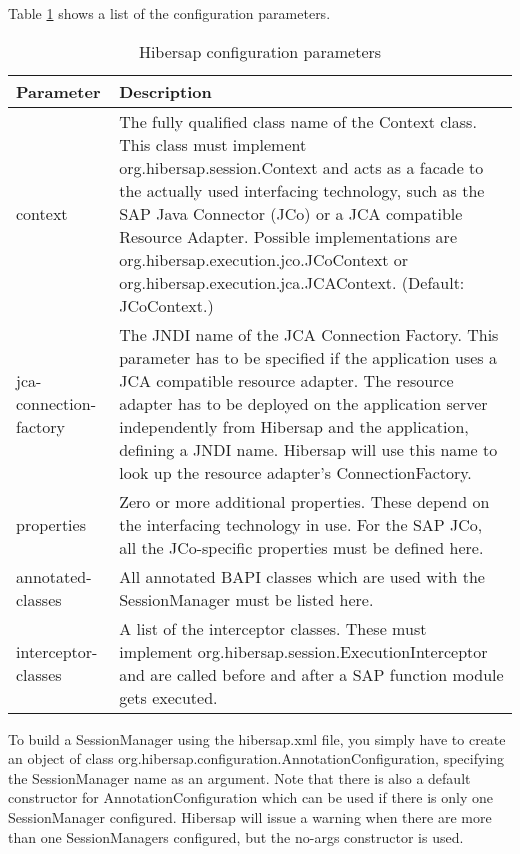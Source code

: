 Table \ref{tab:ConfigurationParameters} shows a list of the configuration parameters.

\begin{table}[H]
  \centering
  \begin{tabular}{ll} 
    \toprule
    \textbf{Parameter}      & \textbf{Description} \\ 
    \midrule
    context                      & \parbox[t]{4.7in}{
    The fully qualified class name of the Context class. This class must implement org.hibersap.session.Context and acts as a   facade to the actually used interfacing technology, such as the SAP Java Connector (JCo) or a JCA compatible Resource Adapter. Possible implementations are org.hibersap.execution.jco.JCoContext or org.hibersap.execution.jca.JCAContext. (Default: JCoContext.)
    }   \\
    jca-connection-factory  & \parbox[t]{4.7in}{
    The JNDI name of the JCA Connection Factory. This parameter has to be specified if the application uses a JCA compatible resource adapter. The resource adapter has to be deployed on the application server independently from Hibersap and the application, defining a JNDI name. Hibersap will use this name to look up the resource adapter's ConnectionFactory. 
    } \\
    properties                   & \parbox[t]{4.7in}{
    Zero or more additional properties. These depend on the interfacing technology in use. For the SAP JCo, all the JCo-specific properties must be defined here.
    } \\
    annotated-classes        & \parbox[t]{4.7in}{
    All annotated BAPI classes which are used with the SessionManager must be listed here.
    } \\
    interceptor-classes       & \parbox[t]{4.7in}{
    A list of the interceptor classes. These must implement org.hibersap.session.ExecutionInterceptor and are called before and after a SAP function module gets executed.
    } \\ 
    \bottomrule
  \end{tabular}
  \caption{Hibersap configuration parameters}
  \label{tab:ConfigurationParameters}
\end{table}

To build a SessionManager using the hibersap.xml file, you simply have to create an object of
class org.\-hibersap.\-configuration.\-AnnotationConfiguration, specifying the SessionManager name as an argument. Note 
that there is also a default constructor for AnnotationConfiguration which can be used if there 
is only one SessionManager configured. Hibersap will issue a warning when there are more than one SessionManagers 
configured, but the no-args constructor is used. 

